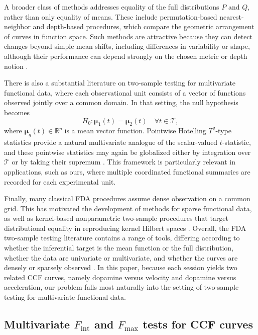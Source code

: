 \documentclass[12pt]{article}
\begin{document}
A broader class of methods addresses equality of the full distributions \(P\) and \(Q\), rather than only equality of means. These include permutation-based nearest-neighbor and depth-based procedures, which compare the geometric arrangement of curves in function space. Such methods are attractive because they can detect changes beyond simple mean shifts, including differences in variability or shape, although their performance can depend strongly on the chosen metric or depth notion \citep{cabana2017permutation}. 

There is also a substantial literature on two-sample testing for multivariate functional data, where each observational unit consists of a vector of functions observed jointly over a common domain. In that setting, the null hypothesis becomes
\[
H_0:\boldsymbol{\mu}_1(t)=\boldsymbol{\mu}_2(t)\quad \forall t\in\mathcal T,
\]
where \(\boldsymbol{\mu}_g(t)\in\mathbb R^p\) is a mean vector function. Pointwise Hotelling \(T^2\)-type statistics provide a natural multivariate analogue of the scalar-valued \(t\)-statistic, and these pointwise statistics may again be globalized either by integration over \(\mathcal T\) or by taking their supremum \citep{qiu2021multivariate}. This framework is particularly relevant in applications, such as ours, where multiple coordinated functional summaries are recorded for each experimental unit.

Finally, many classical FDA procedures assume dense observation on a common grid. This has motivated the development of methods for sparse functional data, as well as kernel-based nonparametric two-sample procedures that target distributional equality in reproducing kernel Hilbert spaces \citep{wang2021sparse,wynne2022kernel}. Overall, the FDA two-sample testing literature contains a range of tools, differing according to whether the inferential target is the mean function or the full distribution, whether the data are univariate or multivariate, and whether the curves are densely or sparsely observed \citep{ramsay2009fda,kokoszka2017introduction,cabana2017permutation,qiu2021multivariate,wang2021sparse,wynne2022kernel}. In this paper, because each session yields two related CCF curves, namely dopamine versus velocity and dopamine versus acceleration, our problem falls most naturally into the setting of two-sample testing for multivariate functional data.

\subsection{Multivariate $F_{\mathrm{int}}$ and $F_{\max}$ tests for CCF curves}
\end{document}
